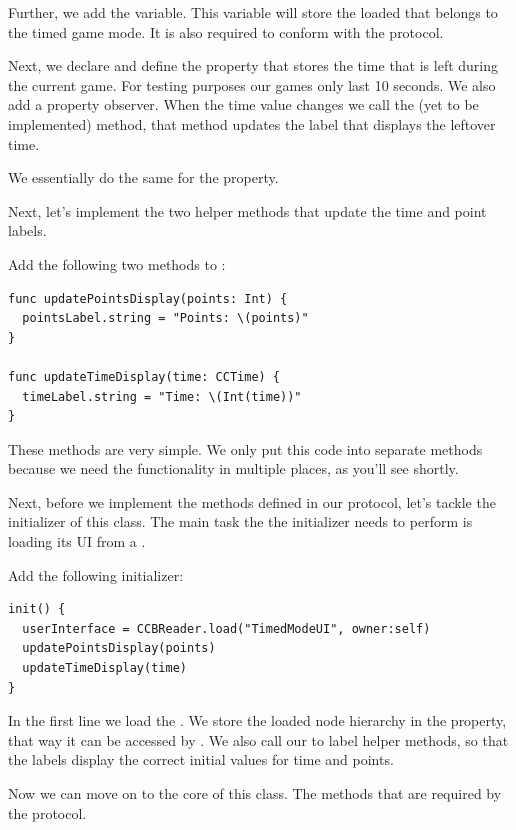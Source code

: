 Further, we add the  variable. This variable will
store the loaded \ccbfile{} that belongs to the timed game mode. It is also
required to conform with the  protocol.

Next, we declare and define the  property that stores the time
that is left during the current game. For testing purposes our games only last 10 seconds. We
also add a property observer. When the time value changes we call the (yet to
be implemented)  method, that method updates the
label that displays the leftover time.

We essentially do the same for the  property.

Next, let's implement the two helper methods that update the time and point
labels.
\begin{leftbar}
Add the following two methods to :
\begin{lstlisting}
func updatePointsDisplay(points: Int) {
  pointsLabel.string = "Points: \(points)"
}

func updateTimeDisplay(time: CCTime) {
  timeLabel.string = "Time: \(Int(time))"
}
\end{lstlisting}
\end{leftbar}
These methods are very simple. We only put this code into separate methods
because we need the functionality in multiple places, as you'll see shortly.

Next, before we implement the methods defined in our protocol, let's tackle the
initializer of this class. The main task the the initializer needs to perform is
loading its UI from a \ccbfile{}.
\begin{leftbar}
Add the following initializer:
\begin{lstlisting}
init() {
  userInterface = CCBReader.load("TimedModeUI", owner:self)
  updatePointsDisplay(points)
  updateTimeDisplay(time)
}
\end{lstlisting}
\end{leftbar}
In the first line we load the  \ccbfile{}. We store the
loaded node hierarchy in the  property, that way it
can be accessed by .
We also call our to label helper methods, so that the labels display the correct
initial values for time and points.

Now we can move on to the core of this class. The methods that are required by
the  protocol.

